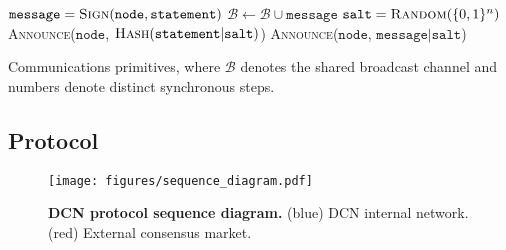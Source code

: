 \documentclass[twocolumn, aps, amsmath, amssymb, nofootinbib, superscriptaddress, longbibliography, floatfix, eqsecnum, rmp]{revtex4-2}
\let\oldalgorithmic\algorithmic
\let\endoldalgorithmic\endalgorithmic
\renewenvironment{algorithmic}
{\begin{adjustwidth}{-1em}{}\oldalgorithmic}
{\endoldalgorithmic\end{adjustwidth}}
\begin{document}

\begin{algorithm}[H]
\begin{algorithmic}
	\State $\mathtt{message} = \textsc{Sign}(\mathtt{node}, \mathtt{statement})$
	\State $\mathcal{B} \gets \mathcal{B} \cup \mathtt{message}$ 
\EndFunction
\State
{}
	\State $\mathtt{salt} = \textsc{Random}(\{0,1\}^n)$
	\State {}
	\State \textsc{Announce}($\mathtt{node}$, $\textsc{Hash}(\mathtt{statement}|\mathtt{salt})$)
	\State {}
	\State \textsc{Announce}($\mathtt{node}$, $\mathtt{message}|\mathtt{salt}$)
\EndFunction
\end{algorithmic}	
\caption{Communications primitives, where $\mathcal{B}$ denotes the shared broadcast channel and numbers denote distinct synchronous steps.} \label{alg:comms_primitive}
\end{algorithm}

\subsection{Protocol}

\begin{figure}[!htb]
	\texttt{[image: figures/sequence\_diagram.pdf]}	
	\caption{\textbf{DCN protocol sequence diagram.} (blue) DCN internal network. (red) External consensus market.} \label{fig:sequence_diagram}
\end{figure}
\end{document}
